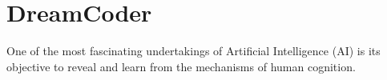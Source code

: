 












\section{DreamCoder}
One of the most fascinating undertakings of Artificial Intelligence (AI) is its objective to reveal and learn from the mechanisms of human cognition.

